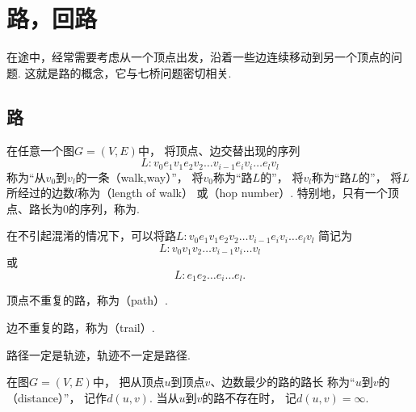 \section{路，回路}
在途中，经常需要考虑从一个顶点出发，沿着一些边连续移动到另一个顶点的问题.
这就是路的概念，它与七桥问题密切相关.

\subsection{路}
\begin{definition}
在任意一个图\(G = (V,E)\)中，
将顶点、边交替出现的序列\begin{equation*}
	L: v_0 e_1 v_1 e_2 v_2 \dotso v_{i-1} e_i v_i \dotso e_l v_l
\end{equation*}称为“从\(v_0\)到\(v_l\)的一条（walk,way）”，
将\(v_0\)称为“路\(L\)的”，
将\(v_l\)称为“路\(L\)的”，
将\(L\)所经过的边数\(l\)称为（length of walk）
或（hop number）.
特别地，只有一个顶点、路长为\(0\)的序列，称为.
\end{definition}

在不引起混淆的情况下，可以将路\(L: v_0 e_1 v_1 e_2 v_2 \dotso v_{i-1} e_i v_i \dotso e_l v_l\)
简记为\begin{equation*}
	L: v_0 v_1 v_2 \dotso v_{i-1} v_i \dotso v_l
\end{equation*}
或\begin{equation*}
	L: e_1 e_2 \dotso e_i \dotso e_l.
\end{equation*}

\begin{definition}
顶点不重复的路，称为（path）.
\end{definition}

\begin{definition}
边不重复的路，称为（trail）.
\end{definition}

\begin{proposition}
路径一定是轨迹，轨迹不一定是路径.
\end{proposition}

\begin{definition}
在图\(G = (V,E)\)中，
把从顶点\(u\)到顶点\(v\)、边数最少的路的路长
称为“\(u\)到\(v\)的（distance）”，
记作\(d(u,v)\).
当从\(u\)到\(v\)的路不存在时，
记\(d(u,v) = \infty\).
\end{definition}

